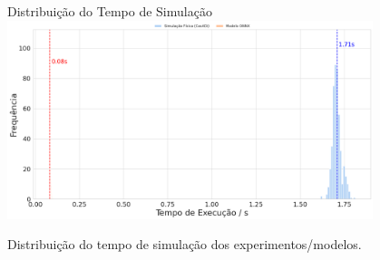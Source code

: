 \begin{frame}{Distribuição do Tempo de Simulação}
\centering
\includegraphics[width=0.8\textwidth]{figures/hist.png}

\vspace{0.3cm}
{\scriptsize Distribuição do tempo de simulação dos experimentos/modelos.}
\end{frame}




